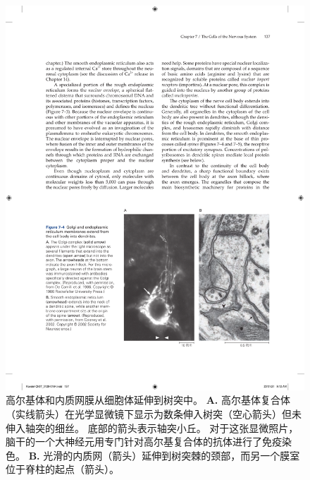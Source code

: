 \begin{figure}[htbp]
	\centering
	\includegraphics[width=0.7\linewidth]{chap07/fig_7_4}
	\caption{高尔基体和内质网膜从细胞体延伸到树突中。
		\textbf{A.} 高尔基体复合体（实线箭头）在光学显微镜下显示为数条伸入树突（空心箭头）但未伸入轴突的细丝。
		底部的箭头表示轴突小丘。
		对于这张显微照片，脑干的一个大神经元用专门针对高尔基复合体的抗体进行了免疫染色\cite{de1986heterogeneous}。
		\textbf{B.} 光滑的内质网（箭头）延伸到树突棘的颈部，而另一个膜室位于脊柱的起点（箭头）\cite{cooney2002endosomal}。}
	\label{fig:7_4}
\end{figure}


